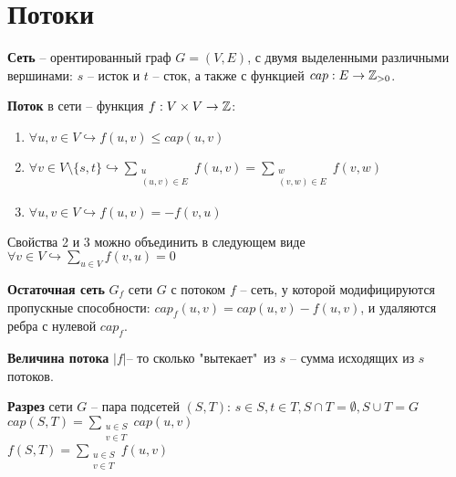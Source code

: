 \section{Потоки}%
\label{sec:Потоки}

\begin{Def}
	\textbf{Сеть} -- орентированный граф $G = (V, E)$, с двумя выделенными различными вершинами: $s$ -- исток и  $t$ -- сток, а также с функцией $cap: E \rightarrow \mathbb{Z}_{>0}$.
\end{Def}

\begin{Def}
	\textbf{Поток} в сети -- функция $f: V \times V \rightarrow \mathbb{Z}$:
	
	\begin{enumerate}
		\item $\forall u, v \in V \hookrightarrow f(u, v) \leq cap(u, v)$
		\item $\forall v \in V \setminus \{s, t\} \hookrightarrow \sum\limits_{\substack{u \\ (u, v) \in E}} f(u, v) = \sum\limits_{\substack{w \\ (v, w) \in E}} f(v, w)$
		\item $\forall u, v \in V \hookrightarrow f(u, v) = -f(v, u)$
	\end{enumerate}

	\begin{note}
		Свойства 2 и 3 можно объединить в следующем виде $\forall v \in V \hookrightarrow \sum\limits_{u \in V} f(v, u) = 0$
	\end{note}
\end{Def}


\begin{Def}
	\textbf{Остаточная сеть} $G_f$ сети  $G$ с потоком $f$ -- сеть, у которой модифицируются пропускные способности:  $cap_f(u, v) = cap(u, v) - f(u, v)$, и удаляются ребра с нулевой  $cap_f$.
\end{Def}

\begin{Def}
	\textbf{Величина потока} $\lvert f \rvert$-- то сколько "вытекает"\ из $s$ -- сумма исходящих из  $s$ потоков.
\end{Def}

\begin{Def}
	\textbf{Разрез} сети $G$ -- пара подсетей $(S, T)$:  $s \in S, t \in T, S \cap T = \emptyset, S \cup T = G$ \\
	$cap(S, T) = \sum\limits_{\substack{u \in S \\ v \in T}} cap(u, v)$  \\
	$f(S, T) = \sum\limits_{\substack{u \in S \\ v \in T}} f(u, v)$ 
\end{Def}

